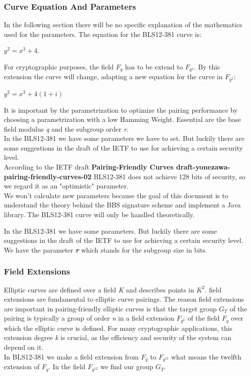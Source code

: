 \documentclass{article}
\begin{document}
\subsubsection{Curve Equation And Parameters}
In the following section there will be no specific explanation of the mathematics used for the parameters. The equation for the BLS12-381 curve is: \\
\begin{center}
 \(y^2=x^3+4\). \\
\end{center}
For cryptographic purposes, the field \(F_q\) has to be extend to \(F_{q^2}\). By this extension the curve will change, adapting a new equation for the curve in \(F_{q^2}\):
\begin{center}
    \(y^2 = x^3 + 4(1+i)\)
\end{center}
It is important by the parametrization to optimize the pairing performance by choosing a parametrization with a low Hamming Weight. Essential are the base field modulus \textit{q} and the subgroup order \textit{r}. \\
In the BLS12-381 we have some parameters we have to set. But luckily there are some suggestions in the draft of the \gls{IETF} \cite{pairing-friendly-curves-website} to use for achieving a certain security level. \\
According to the \gls{IETF} draft \textbf{Pairing-Friendly Curves draft-yonezawa-pairing-friendly-curves-02} \cite{pairing-friendly-curves-website} BLS12-381 does not achieve 128 bits of security, so we regard it as an "optimistic" parameter. \\
We won't calculate new parameters because the goal of this document is to understand the theory behind the BBS signature scheme and implement a Java library. The BLS12-381 curve will only be handled theoretically.

In the BLS12-381 we have some parameters. But luckily there are some suggestions in the draft of the \gls{IETF} to use for achieving a certain security level. \\
We have the parameter \textbf{\textit{r}} which stands for the subgroup size in bits.


\subsubsection{Field Extensions}
Elliptic curves are defined over a field \textit{K} and describes points in \(K^2\).
field extensions are fundamental to elliptic curve pairings. The reason field extensions are important in pairing-friendly elliptic curves is that the target group \(G_T\) of the pairing is typically a group of order \textit{n} in a field extension \(F_{q^k}\) of the field \(F_q\) over which the elliptic curve is defined. For many cryptographic applications, this extension degree \textit{k} is crucial, as the efficiency and security of the system can depend on it. \\
In BLS12-381 we make a field extension from \(F_q\) to \(F_{q^{12}}\) what means the twelfth extension of \(F_q\). In the field \(F_{q^{12}}\) we find our group \(G_T\). \cite{bls12-381-hackmd}
\end{document}
